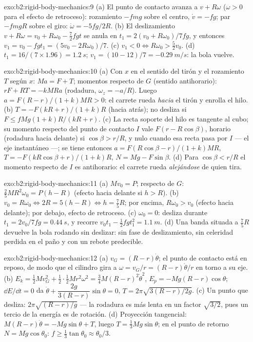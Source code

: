 \begin{solution}{exo:b2:rigid-body-mechanics:9}
(a) El punto de contacto avanza a $v + R\omega$ ($\omega > 0$ para el
efecto de retroceso): rozamiento $-fmg$ sobre el centro, $\dot v = -fg$;
par $-fmgR$ sobre el giro: $\dot\omega = -5fg/2R$. (b) El deslizamiento $v + R\omega = v_0 +
R\omega_0 - \tfrac72fgt$ se anula en $t_1 = 2(v_0 + R\omega_0)/7fg$, y entonces $v_1
= v_0 - fgt_1 = (5v_0 - 2R\omega_0)/7$. (c) $v_1 < 0 \iff R\omega_0 > \tfrac52v_0$.
(d) $t_1 = 16/(7 \times 1.96) = \qty{1.2}{s}$; $v_1 = (10 - 12)/7 = \qty{-0.29}{m/s}$:
la bola vuelve.
\end{solution}

\begin{solution}{exo:b2:rigid-body-mechanics:10}
(a) Con $x$ en el sentido del tirón y el rozamiento $T$ según $x$: $Ma = F + T$;
momentos respecto de $G$ (sentido antihorario): $rF + RT = -kMRa$ (rodadura, $\omega_z
= -a/R$). Luego $a = F(R - r)/(1 + k)MR > 0$: el carrete rueda
\emph{hacia} el tirón y enrolla el hilo. (b) $T = -F(kR + r)/(1 +
k)R$ (hacia atrás); no desliza si $F \le fMg(1 + k)R/(kR + r)$. (c) La recta
soporte del hilo es tangente al cubo; su momento respecto del punto de
contacto $I$ vale $F(r - R\cos\beta)$, horario (rodadura hacia delante) si $\cos\beta >
r/R$, y nulo cuando esa recta pasa por $I$ --- el eje instantáneo ---; se
tiene entonces $a = F(R\cos\beta - r)/(1 + k)MR$, $T = -F(kR\cos\beta + r)/(1 + k)R$,
$N = Mg - F\sin\beta$. (d) Para $\cos\beta < r/R$ el momento respecto de $I$ es
antihorario: el carrete rueda \emph{alejándose} de quien tira.
\end{solution}

\begin{solution}{exo:b2:rigid-body-mechanics:11}
(a) $Mv_0 = P$; respecto de $G$: $\tfrac25MR^2\omega_0 = P(h - R)$ (efecto
hacia delante si $h > R$). (b) $v_0 = R\omega_0 \iff 2R = 5(h - R) \iff h = \tfrac75R$;
por encima, $R\omega_0 > v_0$ (efecto hacia delante); por debajo, efecto de
retroceso. (c) $\omega_0 = 0$: desliza durante $t_1 = 2v_0/7fg = \qty{0.44}{s}$, y recorre $v_0t_1 -
\tfrac12fgt_1^2 = \qty{1.1}{m}$. (d) Una banda situada a $\tfrac75R$ devuelve
la bola rodando sin deslizar: sin fase de deslizamiento, sin celeridad
perdida en el paño y con un rebote predecible.
\end{solution}

\begin{solution}{exo:b2:rigid-body-mechanics:12}
(a) $v_G = (R - r)\dot\theta$; el punto de contacto está en reposo, de modo
que el cilindro gira a $\omega = v_G/r = (R - r)\dot\theta/r$ en torno a su eje.
(b) $E_k = \tfrac12Mv_G^2 + \tfrac12\cdot\tfrac12Mr^2\omega^2 = \tfrac34M(R - r)^2
\dot\theta^2$, $E_p = -Mg(R - r)\cos\theta$; $\dd E/\dd t = 0$ da $\ddot\theta
+ \dfrac{2g}{3(R - r)}\sin\theta = 0$, $T = 2\pi\sqrt{3(R - r)/2g}$. (c) Un
punto que desliza: $2\pi\sqrt{(R - r)/g}$ --- la rodadura es más lenta en un
factor $\sqrt{3/2}$, pues un tercio de la energía es de rotación.
(d) Proyección tangencial: $M(R - r)\ddot\theta =
-Mg\sin\theta + T$, luego $T = \tfrac13Mg\sin\theta$; en el punto de retorno
$N = Mg\cos\theta_0$: $f \ge \tfrac13\tan\theta_0 \approx \theta_0/3$.
\end{solution}

